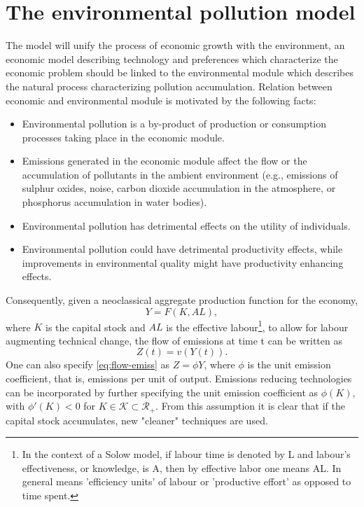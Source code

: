 \section{The environmental pollution model}\label{Sec:model}
The model will unify the process of economic growth with the environment, an economic model describing technology and preferences which characterize the economic problem should be linked to the environmental module which describes the natural process characterizing pollution accumulation. Relation between economic and environmental module is motivated by the following facts:
\begin{itemize}
	\item Environmental pollution is a by-product of production or consumption processes
	taking place in the economic module.
	\item Emissions generated in the economic module affect the flow or the accumulation
	of pollutants in the ambient environment (e.g., emissions of sulphur oxides, noise,
	carbon dioxide accumulation in the atmosphere, or phosphorus accumulation in
	water bodies).
	\item Environmental pollution has detrimental effects on the utility of individuals.
	\item Environmental pollution could have detrimental productivity effects, while improvements in environmental quality might have productivity enhancing effects.
\end{itemize}
Consequently, given a neoclassical aggregate production function for the economy, 
\begin{equation}\label{eq:prod-func}
	Y = F(K, AL), 
\end{equation} 
where $K$ is the capital stock and $AL$ is the effective labour\footnote{ In the context of a Solow model, if labour time is denoted by L and labour's effectiveness, or knowledge, is A, then by effective labor one means AL. In general means 'efficiency units' of labour or 'productive effort' as opposed to time spent.}, to allow for labour augmenting technical change, the flow of emissions at time t can be written as
\begin{equation}\label{eq:flow-emiss}
	Z(t) = v(Y(t)). 
\end{equation}
 One can also specify \eqref{eq:flow-emiss} as $Z=\phi Y$, where $\phi$ is the unit emission coefficient, that is, emissions per unit of output. Emissions reducing technologies can be incorporated by further specifying the unit emission coefficient as $\phi (K)$, with $\phi' (K)<0$ for $K\in \mathcal{K} \subset \mathcal{R_+}$. From this assumption it is clear that if the capital stock accumulates, new "cleaner" techniques are used. 
 
